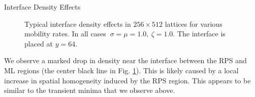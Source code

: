 \documentclass{beamer}
\begin{document}
\begin{frame}{}
\begin{textblock}{0.32}
    \begin{block}{\centering Interface Density Effects}
        \begin{figure}[h]
            \centering
            \caption{\centering Typical interface density effects in $256 \times 512$ lattices for various mobility rates. In all cases $\ \sigma = \mu = 1.0, \ \zeta = 1.0$. The interface is placed at $y = 64$.}
            \label{fig:void}
        \end{figure}
        We observe a marked drop in density near the interface between the RPS and
        ML regions (the center black line in Fig. \ref{fig:void}). This is likely
        caused by a local increase in spatial homogeneity induced by the RPS region. 
        This appears to be similar to the transient minima that we observe above.
    \end{block}


\end{textblock}
\end{frame}
\end{document}
